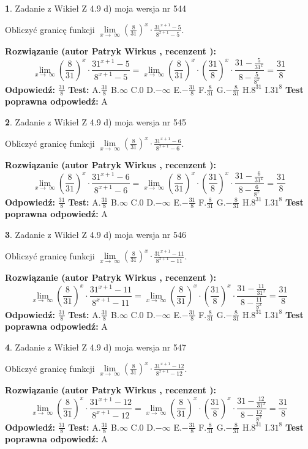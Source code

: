 \documentclass[12pt, a4paper]{article}
\theoremstyle{definition} %
\newtheorem{zad}{}
\newcommand{\zadStart}[1]{\begin{zad}#1\newline}
\newcommand{\zadStop}{\end{zad}}
\newcommand{\rozwStart}[2]{\noindent \textbf{Rozwiązanie (autor #1 , recenzent #2): }\newline}
\newcommand{\rozwStop}{\newline}
\newcommand{\odpStart}{\noindent \textbf{Odpowiedź:}\newline}
\newcommand{\odpStop}{\newline}
\newcommand{\testStart}{\noindent \textbf{Test:}\newline}
\newcommand{\testStop}{\newline}
\newcommand{\kluczStart}{\noindent \textbf{Test poprawna odpowiedź:}\newline}
\newcommand{\kluczStop}{\newline}
\begin{document}
\zadStart{Zadanie z Wikieł Z 4.9 d) moja wersja nr 544}


Obliczyć granicę funkcji  $\lim\limits_{x\to\ \infty}(\frac{8}{31})^{x}\cdot\frac{31^{x+1}-5}{8^{x+1}-5}$.
\zadStop
\rozwStart{Patryk Wirkus}{}
$$\lim\limits_{x\to\ \infty}(\frac{8}{31})^{x}\cdot\frac{31^{x+1}-5}{8^{x+1}-5}=\lim\limits_{x\to\ \infty}(\frac{8}{31})^{x}\cdot(\frac{31}{8})^{x} \cdot \frac{31-\frac{5}{31^{x}}}{8-\frac{5}{8^{x}}} = \frac{31}{8}$$
\rozwStop
\odpStart
$\frac{31}{8}$
\odpStop
\testStart
A.$\frac{31}{8}$ B.$\infty$ C.$0$ D.$-\infty$ E.$-\frac{31}{8}$
F.$\frac{8}{31}$ G.$-\frac{8}{31}$
H.$8^{31}$
I.$31^{8}$
\testStop
\kluczStart
A
\kluczStop



\zadStart{Zadanie z Wikieł Z 4.9 d) moja wersja nr 545}


Obliczyć granicę funkcji  $\lim\limits_{x\to\ \infty}(\frac{8}{31})^{x}\cdot\frac{31^{x+1}-6}{8^{x+1}-6}$.
\zadStop
\rozwStart{Patryk Wirkus}{}
$$\lim\limits_{x\to\ \infty}(\frac{8}{31})^{x}\cdot\frac{31^{x+1}-6}{8^{x+1}-6}=\lim\limits_{x\to\ \infty}(\frac{8}{31})^{x}\cdot(\frac{31}{8})^{x} \cdot \frac{31-\frac{6}{31^{x}}}{8-\frac{6}{8^{x}}} = \frac{31}{8}$$
\rozwStop
\odpStart
$\frac{31}{8}$
\odpStop
\testStart
A.$\frac{31}{8}$ B.$\infty$ C.$0$ D.$-\infty$ E.$-\frac{31}{8}$
F.$\frac{8}{31}$ G.$-\frac{8}{31}$
H.$8^{31}$
I.$31^{8}$
\testStop
\kluczStart
A
\kluczStop



\zadStart{Zadanie z Wikieł Z 4.9 d) moja wersja nr 546}


Obliczyć granicę funkcji  $\lim\limits_{x\to\ \infty}(\frac{8}{31})^{x}\cdot\frac{31^{x+1}-11}{8^{x+1}-11}$.
\zadStop
\rozwStart{Patryk Wirkus}{}
$$\lim\limits_{x\to\ \infty}(\frac{8}{31})^{x}\cdot\frac{31^{x+1}-11}{8^{x+1}-11}=\lim\limits_{x\to\ \infty}(\frac{8}{31})^{x}\cdot(\frac{31}{8})^{x} \cdot \frac{31-\frac{11}{31^{x}}}{8-\frac{11}{8^{x}}} = \frac{31}{8}$$
\rozwStop
\odpStart
$\frac{31}{8}$
\odpStop
\testStart
A.$\frac{31}{8}$ B.$\infty$ C.$0$ D.$-\infty$ E.$-\frac{31}{8}$
F.$\frac{8}{31}$ G.$-\frac{8}{31}$
H.$8^{31}$
I.$31^{8}$
\testStop
\kluczStart
A
\kluczStop



\zadStart{Zadanie z Wikieł Z 4.9 d) moja wersja nr 547}


Obliczyć granicę funkcji  $\lim\limits_{x\to\ \infty}(\frac{8}{31})^{x}\cdot\frac{31^{x+1}-12}{8^{x+1}-12}$.
\zadStop
\rozwStart{Patryk Wirkus}{}
$$\lim\limits_{x\to\ \infty}(\frac{8}{31})^{x}\cdot\frac{31^{x+1}-12}{8^{x+1}-12}=\lim\limits_{x\to\ \infty}(\frac{8}{31})^{x}\cdot(\frac{31}{8})^{x} \cdot \frac{31-\frac{12}{31^{x}}}{8-\frac{12}{8^{x}}} = \frac{31}{8}$$
\rozwStop
\odpStart
$\frac{31}{8}$
\odpStop
\testStart
A.$\frac{31}{8}$ B.$\infty$ C.$0$ D.$-\infty$ E.$-\frac{31}{8}$
F.$\frac{8}{31}$ G.$-\frac{8}{31}$
H.$8^{31}$
I.$31^{8}$
\testStop
\kluczStart
A
\kluczStop
\end{document}
